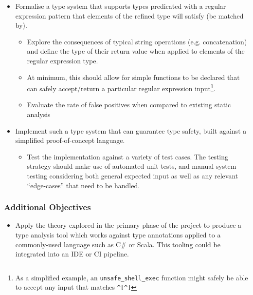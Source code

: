 \documentclass[a4paper,openany,12pt]{book}
\begin{document}
\begin{itemize}
    \item Formalise a type system that supports types predicated with a regular expression pattern that elements of the refined type will satisfy (be matched by).

    \begin{itemize}
        \item Explore the consequences of typical string operations (e.g. concatenation) and define the type of their return value when applied to elements of the regular expression type.

        \item At minimum, this should allow for simple functions to be declared that can safely accept/return a particular regular expression input\footnote{As a simplified example, an \texttt{unsafe\_shell\_exec} function might safely be able to accept any input that matches \texttt{\textasciicircum{}[\textasciicircum{}\textasciigrave{}]\textdollar{}}}.

        \item Evaluate the rate of false positives when compared to existing static analysis
    \end{itemize}

    \item Implement such a type system that can guarantee type safety, built against a simplified proof-of-concept language.
    \begin{itemize}
        \item Test the implementation against a variety of test cases. The testing strategy should make use of automated unit tests, and manual system testing considering both general expected input as well as any relevant ``edge-cases'' that need to be handled.
    \end{itemize}
\end{itemize}

\subsubsection*{Additional Objectives}

\begin{itemize}
    \item Apply the theory explored in the primary phase of the project to produce a type analysis tool which works against type annotations applied to a commonly-used language such as C\# or Scala. This tooling could be integrated into an IDE or CI pipeline.
\end{itemize}
\end{document}
